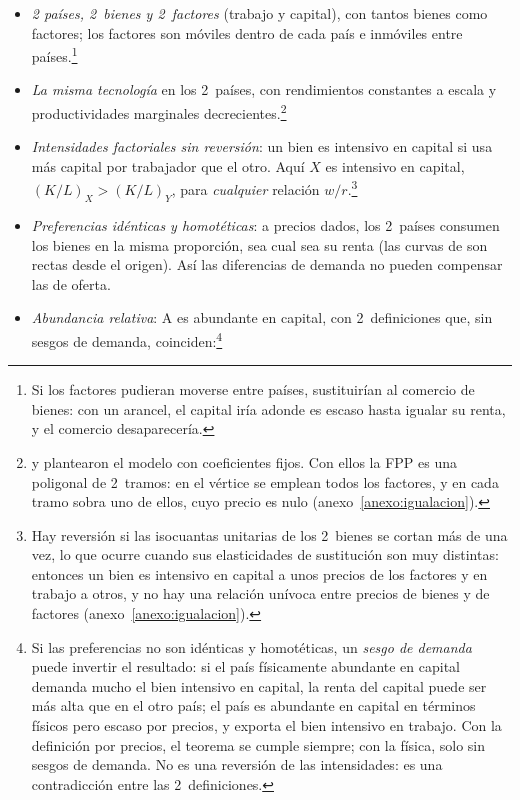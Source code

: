 \documentclass[11pt]{article}
\begin{document}
\begin{itemize}
\item \emph{2 países, 2~bienes y 2~factores} (trabajo y capital), con tantos bienes como factores; los factores son móviles dentro de cada país e inmóviles entre países.\footnote{Si los factores pudieran moverse entre países, sustituirían al comercio de bienes: con un arancel, el capital iría adonde es escaso hasta igualar su renta, y el comercio desaparecería\nocite{Mundell1957}.}
\item \emph{La misma tecnología} en los 2~países, con rendimientos constantes a escala y productividades marginales decrecientes.\footnote{ y  plantearon el modelo con coeficientes fijos. Con ellos la FPP es una poligonal de 2~tramos: en el vértice se emplean todos los factores, y en cada tramo sobra uno de ellos, cuyo precio es nulo (anexo~\ref{anexo:igualacion}).}
\item \emph{Intensidades factoriales sin reversión}: un bien es intensivo en capital si usa más capital por trabajador que el otro. Aquí $X$ es intensivo en capital, $(K/L)_X>(K/L)_Y$, para \emph{cualquier} relación $w/r$.\footnote{Hay reversión si las isocuantas unitarias de los 2~bienes se cortan más de una vez, lo que ocurre cuando sus elasticidades de sustitución son muy distintas: entonces un bien es intensivo en capital a unos precios de los factores y en trabajo a otros, y no hay una relación unívoca entre precios de bienes y de factores\nocite{Minhas1962Homohypallagic} (anexo~\ref{anexo:igualacion}).\label{fn:reversion}}
\item \emph{Preferencias idénticas y homotéticas}: a precios dados, los 2~países consumen los bienes en la misma proporción, sea cual sea su renta (las curvas de  son rectas desde el origen). Así las diferencias de demanda no pueden compensar las de oferta.
\item \emph{Abundancia relativa}: A es abundante en capital, con 2~definiciones que, sin sesgos de demanda, coinciden:\footnote{Si las preferencias no son idénticas y homotéticas, un \emph{sesgo de demanda} puede invertir el resultado: si el país físicamente abundante en capital demanda mucho el bien intensivo en capital, la renta del capital puede ser más alta que en el otro país; el país es abundante en capital en términos físicos pero escaso por precios, y exporta el bien intensivo en trabajo. Con la definición por precios, el teorema se cumple siempre; con la física, solo sin sesgos de demanda. No es una reversión de las intensidades: es una contradicción entre las 2~definiciones.\label{fn:sesgo-demanda}}

\end{itemize}
\end{document}
